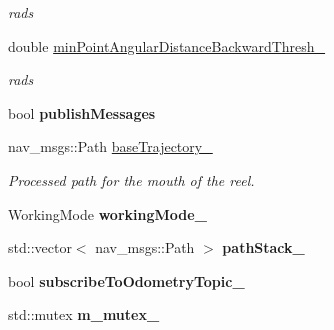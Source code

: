 \begin{DoxyCompactItemize}
\begin{DoxyCompactList}\small\item\em rads \end{DoxyCompactList}\item 
\hypertarget{classsmacc__odom__tracker_1_1OdomTracker_ac7cac171a63c8981f8233f71c94d0776}{double \hyperlink{classsmacc__odom__tracker_1_1OdomTracker_ac7cac171a63c8981f8233f71c94d0776}{min\-Point\-Angular\-Distance\-Backward\-Thresh\-\_\-}}\label{classsmacc__odom__tracker_1_1OdomTracker_ac7cac171a63c8981f8233f71c94d0776}

\begin{DoxyCompactList}\small\item\em rads \end{DoxyCompactList}\item 
\hypertarget{classsmacc__odom__tracker_1_1OdomTracker_a5aaa7b76cae6ed70524d0f2ac04cbe70}{bool {\bfseries publish\-Messages}}\label{classsmacc__odom__tracker_1_1OdomTracker_a5aaa7b76cae6ed70524d0f2ac04cbe70}

\item 
\hypertarget{classsmacc__odom__tracker_1_1OdomTracker_ac3a17be46ab833632c5f63e75c840dc7}{nav\-\_\-msgs\-::\-Path \hyperlink{classsmacc__odom__tracker_1_1OdomTracker_ac3a17be46ab833632c5f63e75c840dc7}{base\-Trajectory\-\_\-}}\label{classsmacc__odom__tracker_1_1OdomTracker_ac3a17be46ab833632c5f63e75c840dc7}

\begin{DoxyCompactList}\small\item\em Processed path for the mouth of the reel. \end{DoxyCompactList}\item 
\hypertarget{classsmacc__odom__tracker_1_1OdomTracker_ad011432ae35a533fd61bae43179c3c36}{Working\-Mode {\bfseries working\-Mode\-\_\-}}\label{classsmacc__odom__tracker_1_1OdomTracker_ad011432ae35a533fd61bae43179c3c36}

\item 
\hypertarget{classsmacc__odom__tracker_1_1OdomTracker_a6cdd5d1199cf4638d70a2232081ac076}{std\-::vector$<$ nav\-\_\-msgs\-::\-Path $>$ {\bfseries path\-Stack\-\_\-}}\label{classsmacc__odom__tracker_1_1OdomTracker_a6cdd5d1199cf4638d70a2232081ac076}

\item 
\hypertarget{classsmacc__odom__tracker_1_1OdomTracker_a394c4040c01f687c427d34c0ab50ba3e}{bool {\bfseries subscribe\-To\-Odometry\-Topic\-\_\-}}\label{classsmacc__odom__tracker_1_1OdomTracker_a394c4040c01f687c427d34c0ab50ba3e}

\item 
\hypertarget{classsmacc__odom__tracker_1_1OdomTracker_ad65e52bfd236e073940808c35f2bed8c}{std\-::mutex {\bfseries m\-\_\-mutex\-\_\-}}\label{classsmacc__odom__tracker_1_1OdomTracker_ad65e52bfd236e073940808c35f2bed8c}

\end{DoxyCompactItemize}


